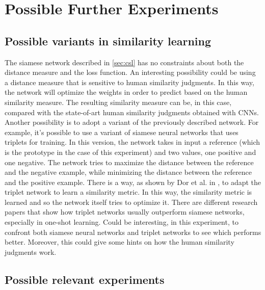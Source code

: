 \documentclass[conference]{IEEEtran}
\begin{document}
	\section{Possible Further Experiments}
	
		\subsection{Possible variants in similarity learning}
		
			\noindent The siamese network described in \ref{sec:csl} has no constraints about both the distance measure and the loss function. An interesting possibility could be using a distance measure that is sensitive 
			to human similarity judgments. In this way, the network will optimize the weights in order to predict based on the human similarity measure. The resulting similarity measure can be, in this case, 
			compared with the state-of-art human similarity judgments obtained with CNNs.\\
			Another possibility is to adopt a variant of the previously described network. For example, it's possible to use a variant of siamese neural networks that uses triplets for training. In this version, 
			the network takes in input a reference (which is the prototype in the case of this experiment) and two values, one positive and one negative. The network tries to maximize the distance between the reference and 
			the negative example, while minimizing the distance between the reference and the positive example. There is a way, as shown by Dor et al. in \cite{ein-dor-etal-2018-learning}, to adapt the triplet 
			network to learn a similarity metric. In this way, the similarity metric is learned and so the network itself tries to optimize it. There are different research papers that show how triplet networks 
			usually outperform siamese networks, especially in one-shot learning. Could be interesting, in this experiment, to confront both siamese neural networks and triplet networks to see which performs better. 
			Moreover, this could give some hints on how the human similarity judgments work.
		
		\subsection{Possible relevant experiments}
	
\end{document}

